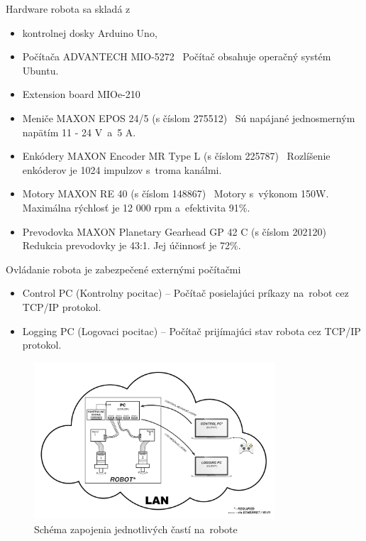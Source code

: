 Hardware robota sa skladá z
\begin{itemize}
	\item kontrolnej dosky Arduino Uno,

	\item Počítača ADVANTECH MIO-5272~\cite{robotPc} \newline
		Počítač obsahuje operačný systém Ubuntu.

	\item Extension board MIOe-210~\cite{extensionModule}

	\item Meniče MAXON EPOS 24/5 (s číslom 275512)~\cite{menic} \newline
	 	Sú napájané jednosmerným napätím 11 - 24 V~a~5 A.

	\item Enkódery MAXON Encoder MR Type L (s číslom 225787)~\cite{encoder} \newline
		Rozlíšenie enkóderov je 1024 impulzov s~troma kanálmi.

	\item Motory MAXON RE 40 (s číslom 148867)~\cite{motor} \newline
		Motory s~výkonom 150W. Maximálna rýchlosť je 12 000 rpm a~efektivita 91\%.

	\item Prevodovka MAXON Planetary Gearhead GP 42 C (s číslom 202120)~\cite{prevodovka} \newline
		Redukcia prevodovky je 43:1. Jej účinnosť je 72\%.
\end{itemize}

\noindent Ovládanie robota je zabezpečené externými počítačmi
\begin{itemize}
	\item Control PC (Kontrolny pocitac) -- Počítač posielajúci príkazy na~robot cez TCP/IP protokol.
	\item Logging PC (Logovaci pocitac) -- Počítač prijímajúci stav robota cez TCP/IP protokol.
\end{itemize}

\begin{figure}[!htbp]
	\begin{center}
		\includegraphics[width=9cm]{img/schemaRobota.png}
	\end{center}
	\caption{Schéma zapojenia jednotlivých častí na~robote}
	\label{fig:schemaRobota}
\end{figure}

